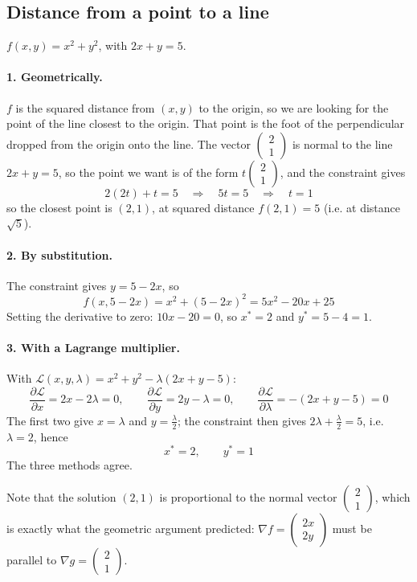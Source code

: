 \documentclass[]{article}
\begin{document}
	\subsection{Distance from a point to a line}

	$f(x,y) = x^2 + y^2$, with $2x + y = 5$.

	\paragraph{1. Geometrically.}
	$f$ is the squared distance from $(x,y)$ to the origin, so we are looking for the point of the line closest to the origin.
	That point is the foot of the perpendicular dropped from the origin onto the line.
	The vector $\begin{pmatrix} 2 \\ 1 \end{pmatrix}$ is normal to the line $2x + y = 5$, so the point we want is of the form $t\begin{pmatrix} 2 \\ 1 \end{pmatrix}$, and the constraint gives
	$$
	2(2t) + t = 5 \quad \Longrightarrow \quad 5t = 5 \quad \Longrightarrow \quad t = 1
	$$
	so the closest point is $(2,1)$, at squared distance $f(2,1) = 5$ (i.e. at distance $\sqrt{5}$).

	\paragraph{2. By substitution.}
	The constraint gives $y = 5 - 2x$, so
	$$
	f(x, 5-2x) = x^2 + (5-2x)^2 = 5x^2 - 20x + 25
	$$
	Setting the derivative to zero: $10x - 20 = 0$, so $x^* = 2$ and $y^* = 5 - 4 = 1$. \checkmark

	\paragraph{3. With a Lagrange multiplier.}
	With $\mathcal{L}(x,y,\lambda) = x^2 + y^2 - \lambda(2x + y - 5)$:
	$$
	\frac{\partial \mathcal{L}}{\partial x} = 2x - 2\lambda = 0,
	\qquad
	\frac{\partial \mathcal{L}}{\partial y} = 2y - \lambda = 0,
	\qquad
	\frac{\partial \mathcal{L}}{\partial \lambda} = -(2x + y - 5) = 0
	$$
	The first two give $x = \lambda$ and $y = \frac{\lambda}{2}$; the constraint then gives $2\lambda + \frac{\lambda}{2} = 5$, i.e. $\lambda = 2$, hence
	$$
	x^* = 2, \qquad y^* = 1
	$$
	The three methods agree. \checkmark

	Note that the solution $(2,1)$ is proportional to the normal vector $\begin{pmatrix} 2 \\ 1 \end{pmatrix}$, which is exactly what the geometric argument predicted: $\nabla f = \begin{pmatrix} 2x \\ 2y \end{pmatrix}$ must be parallel to $\nabla g = \begin{pmatrix} 2 \\ 1 \end{pmatrix}$.
\end{document}
